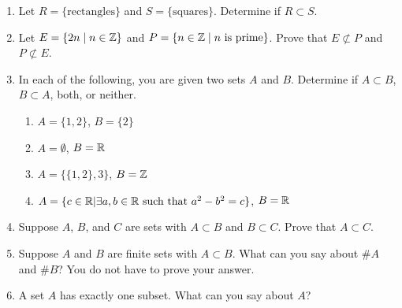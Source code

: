 \probsec{~\ref{sec:subsets}}
\begin{enumerate}
  \item Let $R = \{\text{rectangles}\}$ and $S = \{\text{squares}\}$. Determine if $R \subset S$.

  \item Let $E = \{2n \mid n \in \mathbb{Z}\}$ and $P = \{n \in \mathbb{Z} \mid n \text{ is prime}\}$. Prove that $E \not\subset P$ and $P \not\subset E$.

  \item In each of the following, you are given two sets $A$ and $B$. Determine if $A \subset B$, $B \subset A$, both, or neither.
\begin{enumerate}
    \item $A = \{1, 2\}$, $B = \{2\}$
    \item $A = \emptyset$, $B = \mathbb{R}$
    \item $A = \{\{1,2\}, 3\}$, $B = \mathbb{Z}$
    \item $A = \{c \in \mathbb{R} | \exists a, b \in \mathbb{R} \text{ such that } a^2 - b^2 = c\}$, $B = \mathbb{R}$
\end{enumerate}


  \item Suppose $A$, $B$, and $C$ are sets with $A \subset B$ and $B \subset C$. Prove that $A \subset C$.

  \item Suppose $A$ and $B$ are finite sets with $A \subset B$. What can you say about $\# A$ and $\# B$? You do not have to prove your answer.

  \item A set $A$ has exactly one subset. What can you say about $A$?
\end{enumerate}
